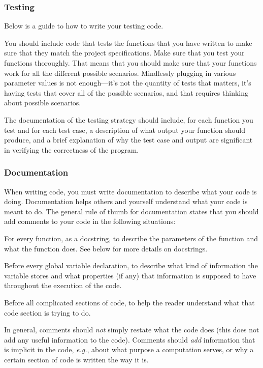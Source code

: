 \documentclass[11pt]{article}
\let\latinabb\emph
\newcommand*{\eg}{\latinabb{e.g.}}
\let\ezimeti\itemize
\let\ezimetidne\enditemize
\renewenvironment{itemize}
   {\ezimeti
    \setlength{\topsep}{.25ex plus .125ex minus .1825ex}%
    \setlength{\itemsep}{\topsep}\setlength{\parsep}{0ex}%
    \setlength{\leftmargin}{1.75em}\setlength{\labelsep}{.5em}%
    \setlength{\labelwidth}{1.75em}\ignorespaces}
   {\ezimetidne}
\newcommand*{\heading}[1]{\subsubsection*{#1}}
\begin{document}
\heading{Testing}

Below is a guide to how to write your testing code.

You should include code that tests the functions that you have written to 
make sure that they match the project specifications.  Make sure that you 
test your functions thoroughly.  That means that you should make sure that 
your functions work for all the different possible scenarios.  Mindlessly 
plugging in various parameter values is not enough---it's not the quantity 
of tests that matters, it's having tests that cover all of the possible 
scenarios, and that requires thinking about possible scenarios.

{}  The documentation of the testing strategy should include, for each 
function you test and for each test case, a description of what output your 
function should produce, and a brief explanation of why the test case and 
output are significant in verifying the correctness of the program.

\heading{Documentation}



When writing code, you must write documentation to describe what your code 
is doing.  Documentation helps others and yourself understand what your 
code is meant to do.  The general rule of thumb for documentation states 
that you should add comments to your code in the following situations:
\begin{itemize}
\item
    For every function, as a docstring, to describe the parameters of the 
    function and what the function does.  See below for more details on 
    docstrings.
\item
    Before every global variable declaration, to describe what kind of 
    information the variable stores and what properties (if any) that 
    information is supposed to have throughout the execution of the code.
\item
    Before all complicated sections of code, to help the reader understand 
    what that code section is trying to do.
\item
    In general, comments should \emph{not} simply restate what the code 
    does (this does not add any useful information to the code).  Comments 
    should \emph{add} information that is implicit in the code, \eg, about 
    what purpose a computation serves, or why a certain section of code is 
    written the way it is.
\end{itemize}
\end{document}
